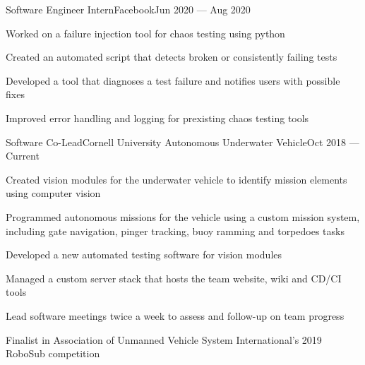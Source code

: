 \documentclass{resume}
\begin{document}
\begin{experience}
    \begin{entry}{Software Engineer Intern}{Facebook}{Jun 2020 --- Aug 2020}
        \begin{description}
            \item Worked on a failure injection tool for chaos testing using
                python
            \item Created an automated script that detects broken or consistently
                failing tests
            \item Developed a tool that diagnoses a test failure and notifies
                users with possible fixes
            \item Improved error handling and logging for prexisting chaos
                testing tools
        \end{description}
    \end{entry}

    \begin{entry}{Software Co-Lead}{Cornell University Autonomous Underwater
        Vehicle}{Oct 2018 --- Current}
        \begin{description}
            \item Created vision modules for the underwater vehicle to identify
                mission elements using computer vision
            \item Programmed autonomous missions for the vehicle using a custom
                mission system, including gate navigation, pinger tracking, buoy
                ramming and torpedoes tasks
            \item Developed a new automated testing software for vision modules
            \item Managed a custom server stack that hosts the team website,
                wiki and CD/CI tools
            \item Lead software meetings twice a week to assess and follow-up on
                team progress
            \item Finalist in Association of Unmanned Vehicle System
                International's 2019 RoboSub competition
        \end{description}
    \end{entry}



\end{experience}
\end{document}
